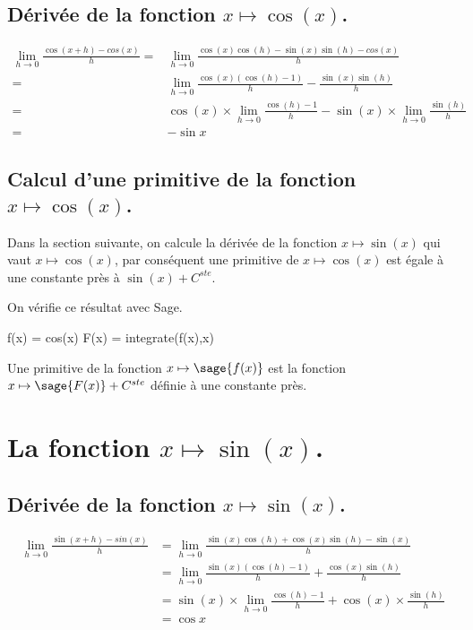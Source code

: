 \documentclass[a4paper,12pt]{report}
\begin{document}
\subsection{Dérivée de la fonction $x \mapsto \cos(x)$.}

\begin{align*}
\lim_{h\to 0} \frac{\cos(x+h)-cos(x)}{h} = &\lim_{h\to 0} \frac{\cos(x)\cos(h)-\sin(x)\sin(h)-cos(x)}{h} \\ =& \lim_{h\to 0} \frac{\cos(x)(\cos(h)-1)}{h}-\frac{\sin(x)\sin(h)}{h}\\  =&  \cos(x) \times \lim_{h\to 0}\frac{\cos(h)-1}{h}- \sin(x) \times \lim_{h\to 0} \frac{\sin(h)}{h}\\  =& -\sin{x}
\end{align*}

\subsection{Calcul d'une primitive de la fonction  $x \mapsto \cos(x)$.}

Dans la section suivante, on calcule la dérivée de la fonction $x \mapsto \sin(x)$ qui vaut $x \mapsto \cos(x)$, par conséquent une primitive de $x \mapsto \cos(x)$ est égale à une constante près à $  \sin(x) + C^{ste} $.

On vérifie ce résultat avec Sage.

\begin{sageblock}
    f(x) = cos(x)
    F(x) = integrate(f(x),x)
\end{sageblock}

Une primitive de la fonction $x \mapsto \sage{f(x)}$  est la fonction $x \mapsto \sage{F(x)} + C^{ste} $ définie à une constante près.


\section{La fonction  $x \mapsto \sin(x)$.}


\subsection{Dérivée de la fonction $x \mapsto \sin(x)$.}


\begin{align*}
\lim_{h\to 0} \frac{\sin(x+h)-sin(x)}{h} & = \lim_{h\to 0} \frac{\sin(x)\cos(h)+\cos(x)\sin(h)-\sin(x)}{h} \\  & =  \lim_{h\to 0} \frac{\sin(x)(\cos(h)-1)}{h}+\frac{\cos(x)\sin(h)}{h} \\ & = \sin(x) \times  \lim_{h\to 0} \frac{\cos(h)-1}{h}+\cos(x) \times \frac{\sin(h)}{h} \\ & = \cos{x}
\end{align*}
\end{document}

